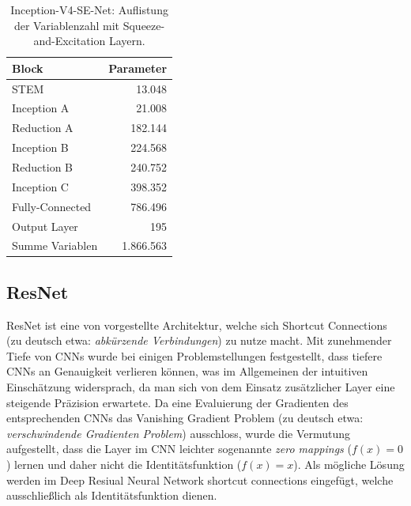 \begin{table}
\centering
\caption{Inception-V4-SE-Net: Auflistung der Variablenzahl mit Squeeze-and-Excitation Layern.}
\begin{tabular}{@{}lr@{}}
\hline
Block & Parameter\\
\hline
STEM &  13.048\\
Inception A & 21.008\\
Reduction A & 182.144\\
Inception B & 224.568\\
Reduction B & 240.752\\
Inception C & 398.352\\
Fully-Connected & 786.496\\
Output Layer & 195\\
\hline
Summe Variablen & 1.866.563\\
\hline
\end{tabular}
\label{tb:var_inc_se}
\end{table}

\subsection{ResNet}
\label{sek:resnet}
ResNet ist eine von \textcite{He_2016} vorgestellte Architektur, welche sich Shortcut Connections (zu deutsch etwa: \textit{abkürzende Verbindungen}) zu nutze macht. Mit zunehmender Tiefe von CNNs wurde bei einigen Problemstellungen festgestellt, dass tiefere CNNs an Genauigkeit verlieren können, was im Allgemeinen der intuitiven Einschätzung widersprach, da man sich von dem Einsatz zusätzlicher Layer eine steigende Präzision erwartete. Da eine Evaluierung der Gradienten des entsprechenden CNNs das Vanishing Gradient Problem (zu deutsch etwa: \textit{verschwindende Gradienten Problem}) ausschloss, wurde die Vermutung aufgestellt, dass die Layer im CNN leichter sogenannte \textit{zero mappings} ($f(x) = 0$) lernen und daher nicht die Identitätsfunktion ($f(x) = x$). Als mögliche Lösung werden im Deep Resiual Neural Network shortcut connections eingefügt, welche ausschließlich als Identitätsfunktion dienen. 

